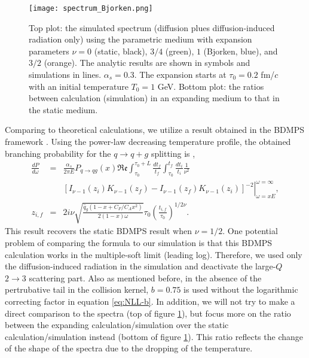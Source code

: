 \begin{figure}
\singlespacing
\centering
\texttt{[image: spectrum\_Bjorken.png]}
\caption[Top plot: the simulated spectrum (diffusion plues diffusion-induced]{Top plot: the simulated spectrum (diffusion plues diffusion-induced radiation only) using the parametric medium with expansion parameters $\nu = 0$ (static, black), $3/4$ (green), $1$ (Bjorken, blue), and $3/2$ (orange). The analytic results are shown in symbols and simulations in lines. $\alpha_s=0.3$. The expansion starts at $\tau_0 = 0.2$ fm/$c$ with an initial temperature $T_0 = 1$ GeV. Bottom plot: the ratios between calculation (simulation) in an expanding medium to that in the static medium.}
\label{fig:Bjorken-BDMPS}
\end{figure}

Comparing to theoretical calculations, we utilize a result obtained in the BDMPS framework \cite{Baier:1996kr,Baier:1998yf}.
Using the power-law decreasing temperature profile, the obtained branching probability for the $q\rightarrow q+g$ splitting is \cite{Baier:1998yf},
\begin{eqnarray}
\frac{dP}{d\omega} &=& \frac{\alpha_s}{2\pi E}P_{q\rightarrow qg}(x)\mathfrak{Re}\int_{\tau_0}^{\tau_0+L}\frac{dt_f}{t_f}\int_{\tau_0}^{t_f}\frac{dt_i}{t_i} \frac{1}{\nu^2}\\
\nonumber
&& \left.\left[ I_{\nu-1}(z_i)K_{\nu-1}(z_f)-I_{\nu-1}(z_f)K_{\nu-1}(z_i)\right]^{-2}\right|_{\omega=xE}^{\omega=\infty},\\
z_{i,f} &=& 2i\nu \sqrt{\frac{\hat{q}_g(1-x+C_F/C_A x^2)}{2(1-x)\omega}} \tau_0 \left( \frac{t_{i,f}}{\tau_0}\right) ^{1/2\nu}.
\end{eqnarray}
This result recovers the static BDMPS result \cite{Baier:1996kr} when $\nu=1/2$.
One potential problem of comparing the formula to our simulation is that this BDMPS calculation works in the multiple-soft limit (leading log).
Therefore, we used only the diffusion-induced radiation in the simulation and deactivate the large-$Q$ $2\rightarrow 3$ scattering part.
Also as mentioned before, in the absence of the pertrubative tail in the collision kernel, $b=0.75$ is used without the logarithmic correcting factor in equation \ref{eq:NLL-b}.
In addition, we will not try to make a direct comparison to the spectra (top of figure \ref{fig:Bjorken-BDMPS}), but focus more on the ratio between the expanding calculation/simulation over the static calculation/simulation instead (bottom of figure \ref{fig:Bjorken-BDMPS}).
This ratio reflects the change of the shape of the spectra due to the dropping of the temperature.

